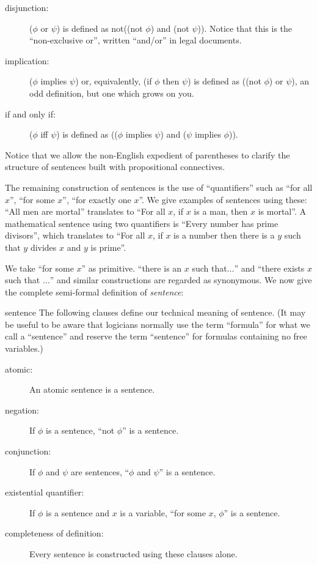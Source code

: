 \begin{description}

\item[\fdescr disjunction:] ($\phi$ or $\psi$) is defined as not((not $\phi$)
  and
 (not $\psi$)).  Notice that this is the ``non-exclusive or'', written
 ``and/or'' in legal documents.

\item[\fdescr implication:] ($\phi$ implies $\psi$) or, equivalently, (if
 $\phi$ then $\psi$) is defined as ((not $\phi$) or $\psi$), an odd
 definition, but one which grows on you.

\item[\fdescr if and only if:] ($\phi$ iff $\psi$) is defined as (($\phi$
 implies $\psi$) and ($\psi$ implies $\phi$)).

\end{description}

Notice that we allow the non-English expedient of parentheses to
clarify the structure of sentences built with propositional
connectives.

The remaining construction of sentences is the use of ``quantifiers''
such as ``for all $x$'', ``for some $x$'', ``for exactly one $x$''.
We give examples of sentences using these: ``All men are mortal''
translates to ``For all $x$, if $x$ is a man, then $x$ is mortal''.  A
mathematical sentence using two quantifiers is ``Every number has
prime divisors'', which translates to ``For all $x$, if $x$ is a
number then there is a $y$ such that $y$ divides $x$ and $y$ is
prime''.

We take ``for some $x$'' as primitive.  ``there is an $x$ such
that$\ldots$'' and ``there exists $x$ such that $\ldots$'' and similar
constructions are regarded as synonymous.  We now give the complete
semi-formal definition of {\itshape sentence\/}:

\begin{Definition}{sentence}
 The following clauses define our
 technical meaning of {\upshape sentence\/}.  (It may be useful to be aware
 that logicians normally use the term ``formula'' for what we call a
 ``sentence'' and reserve the term ``sentence'' for formulas containing
 no free variables.)
 \begin{description}
  \item[\fdescr atomic: ]  An atomic sentence is a sentence.
  \item[\fdescr negation: ]  If $\phi$ is a sentence, ``not $\phi$'' is a
    sentence.
  \item[\fdescr conjunction: ] If $\phi$ and $\psi$ are sentences, ``$\phi$ and
    $\psi$'' is a sentence.
  \item[\fdescr existential quantifier: ] If $\phi$ is a sentence and $x$ is a
    variable, ``for some $x$, $\phi$'' is a sentence.
  \item[\fdescr completeness of definition: ] Every sentence is constructed
    using 
    these clauses alone.
 \end{description}
\end{Definition}

